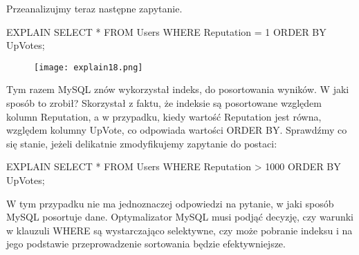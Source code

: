 Przeanalizujmy teraz następne zapytanie.

\begin{spverbatim}
	EXPLAIN SELECT * FROM Users WHERE Reputation = 1 ORDER BY UpVotes;
\end{spverbatim}
\begin{figure}[H]
	\texttt{[image: explain18.png]} 
\end{figure}
Tym razem MySQL znów wykorzystał indeks, do posortowania wyników. W jaki sposób to zrobił? 
Skorzystał z faktu, że indeksie są posortowane względem kolumn Reputation, a w przypadku, kiedy wartość Reputation jest równa, względem kolumny UpVote, co odpowiada wartości ORDER BY.
Sprawdźmy co się stanie, jeżeli delikatnie zmodyfikujemy zapytanie do postaci:
\begin{spverbatim}
	EXPLAIN SELECT * FROM Users WHERE Reputation > 1000 ORDER BY UpVotes;
\end{spverbatim}

W tym przypadku nie ma jednoznaczej odpowiedzi na pytanie, w jaki sposób MySQL posortuje dane. Optymalizator MySQL musi podjąć decyzję, czy warunki w klauzuli WHERE są wystarczająco selektywne, czy może pobranie indeksu i na jego podstawie przeprowadzenie sortowania będzie efektywniejsze.


